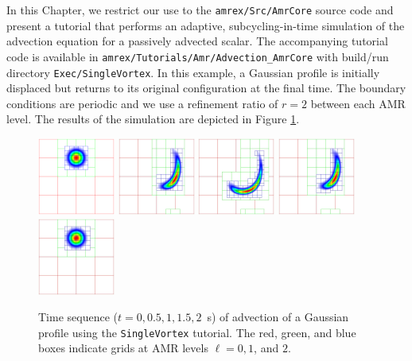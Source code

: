 In this Chapter, we restrict our use to the {\tt amrex/Src/AmrCore} source code
and present a tutorial that performs an adaptive, subcycling-in-time simulation
of the advection equation for a passively advected scalar.
The accompanying tutorial code is available in {\tt amrex/Tutorials/Amr/Advection\_AmrCore}
with build/run directory {\tt Exec/SingleVortex}.  In this example, a Gaussian profile is
initially displaced but returns to its original configuration at the final time.
The boundary conditions are periodic and we use a refinement ratio of $r=2$ between each AMR level.
The results of the simulation are depicted in Figure \ref{fig:Adv}.
\begin{figure}
  \centering
  \includegraphics[width=1in]{./AmrCore/figs/Adv1.pdf}
  \includegraphics[width=1in]{./AmrCore/figs/Adv2.pdf}
  \includegraphics[width=1in]{./AmrCore/figs/Adv3.pdf}
  \includegraphics[width=1in]{./AmrCore/figs/Adv4.pdf}
  \includegraphics[width=1in]{./AmrCore/figs/Adv5.pdf}
  \caption{\label{fig:Adv} Time sequence ($t=0,0.5,1,1.5,2$~s) of advection of a Gaussian profile using the 
{\tt SingleVortex} tutorial.  The red, green, and blue boxes indicate grids at AMR levels $\ell=0,1$, and $2$.}
\end{figure}

